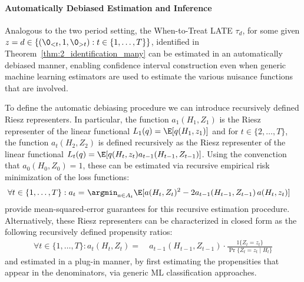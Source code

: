 \paragraph{Automatically Debiased Estimation and Inference}

Analogous to the two period setting, the When-to-Treat LATE $\tau_d$, for some given $z=d\in\{(\0_{<t},1,\0_{>t}): t\in \{1, \ldots, T\}\}$, identified in Theorem~\ref{thm:2_identification_many} can be estimated in an automatically debiased manner, enabling confidence interval construction even when generic machine learning estimators are used to estimate the various nuisance functions that are involved. 

To define the automatic debiasing procedure we can introduce recursively defined Riesz representers. In particular, the function $a_1(H_1, Z_1)$ is the Riesz representer of the linear functional $L_1(q)=\E[q(H_1, z_1)]$ and for $t\in \{2, \ldots, T\}$, the function $a_t(H_2, Z_2)$ is defined recursively as the Riesz representer of the linear functional $L_t(q)=\E[q(H_t, z_t) a_{t-1}(H_{t-1}, Z_{t-1})]$. Using the convenction that $a_0(H_0, Z_0)=1$, these can be estimated via recursive empirical risk minimization of the loss functions:
\begin{equation}\label{eqn:riesz_many}
\begin{aligned}
    \forall t\in \{1,\ldots, T\}: a_t =~& \argmin_{a\in A_t} \E[a(H_t, Z_t)^2 - 2 a_{t-1}(H_{t-1}, Z_{t-1})\,a(H_t, z_t)]
\end{aligned}
\end{equation}
\cite{chernozhukov2022automatic} provide mean-squared-error guarantees for this recursive estimation procedure. Alternatively, these Riesz representers can be characterized in closed form as the following recursively defined propensity ratios: 
\begin{align}
    \forall t\in \{1,\ldots, T\}: a_t(H_t, Z_t) =~& a_{t-1}(H_{t-1}, Z_{t-1}) \cdot \frac{1\{Z_t=z_t\}}{\Pr\{Z_t=z_t\mid H_t\}} 
\end{align}
and estimated in a plug-in manner, by first estimating the propensities that appear in the denominators, via generic ML classification approaches.

